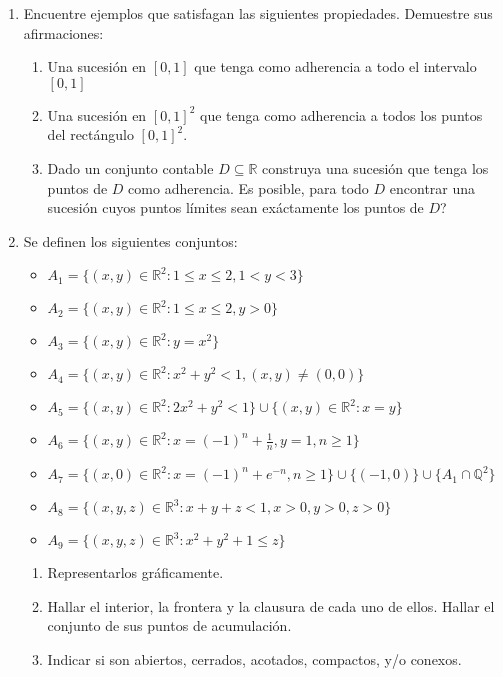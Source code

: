 \documentclass[11pt]{article}
\newcounter{cuent}
\newcommand{\R}{\mathbb{R}}
\begin{document}
\begin{enumerate}
\item Encuentre ejemplos que satisfagan las siguientes propiedades. Demuestre sus afirmaciones:
\begin{enumerate}
\item Una sucesi\'on en $[0,1]$ que tenga como adherencia a todo el intervalo $[0,1]$
\item Una sucesi\'on en $[0,1]^2$ que tenga como adherencia a todos los puntos del rectángulo $[0,1]^2$.

\item Dado un conjunto contable $D\subseteq \mathbb{R}$ construya una sucesión que tenga los puntos de $D$ como adherencia. Es posible, para todo $D$ encontrar una sucesión cuyos puntos límites sean exáctamente los puntos de $D$?
\end{enumerate}



\item  Se definen los siguientes conjuntos:
       \begin{itemize}
         \item[] $A_1=\{(x,y)\in \R^{2} \colon 1\leq x \leq 2 , 1<y<3 \}$ 
         \item[] $A_2 =\{(x,y)\in \R^{2} \colon 1\leq x \leq 2 , y>0 \}$ 
         \item[] $A_3 =\{(x,y)\in \R^{2} \colon y=x^2 \}$  
         \item[] $A_4 =\{(x,y)\in \R^{2} \colon x^2 +y^2 <1,(x,y)\neq
           (0,0) \}$  
         \item[] $A_5 =\{(x,y)\in \R^{2} \colon 2x^2 +y^2 <1 \} \cup
           \{ (x,y)\in \R^2 \colon x=y \}$  
         \item[] $A_6 =\{(x,y)\in \R^{2} \colon x=(-1)^n +\frac{1}{n},
           y=1 , n\geq 1 \}$  
         \item[] $A_7 =\{(x,0)\in \R^{2} \colon x=(-1)^n + e^{-n}
           ,n\geq 1 \} \cup \{(-1,0)\}\cup \{A_1\cap \mathbb{Q}^2 \}$  
         \item[] $A_8 =\{(x,y,z)\in \R^{3} \colon x+y+z<1,x>0,y>0,z>0
           \}$  
         \item[] $A_9 =\{(x,y,z)\in \R^{3} \colon x^2 +y^2 +1\leq z \}$ 
       \end{itemize}
       \begin{enumerate}
         \item Representarlos gr\'aficamente.
         \item Hallar el interior, la frontera y la clausura de cada uno de ellos. Hallar el conjunto de sus puntos de acumulaci\'on.
         \item Indicar si son abiertos, cerrados, acotados, compactos, y/o conexos. 
         

\end{enumerate}
\end{enumerate}
\end{document}
